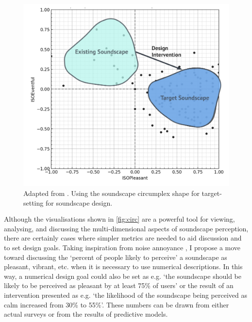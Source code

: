 \begin{figure}[h]
  \centering
  \includegraphics[width=.8\textwidth]{Figures/CainCircumplexTarget.png}
  \caption{Adapted from \citet[Fig. 6]{Cain2013development}. Using the soundscape circumplex shape for target-setting for soundscape design. \label{fig:cainCircumplex}}
\end{figure}

Although the visualisations shown in \cref{fig:circ} are a powerful tool for viewing, analysing, and discussing the multi-dimensional aspects of soundscape perception, there are certainly cases where simpler metrics are needed to aid discussion and to set design goals. Taking inspiration from noise annoyance \citep{ISO15666}, I propose a move toward discussing the `percent of people likely to perceive' a soundscape as pleasant, vibrant, etc. when it is necessary to use numerical descriptions. In this way, a numerical design goal could also be set as e.g. `the soundscape should be likely to be perceived as pleasant by at least 75\% of users' or the result of an intervention presented as e.g. `the likelihood of the soundscape being perceived as calm increased from 30\% to 55\%'. These numbers can be drawn from either actual surveys or from the results of predictive models.

